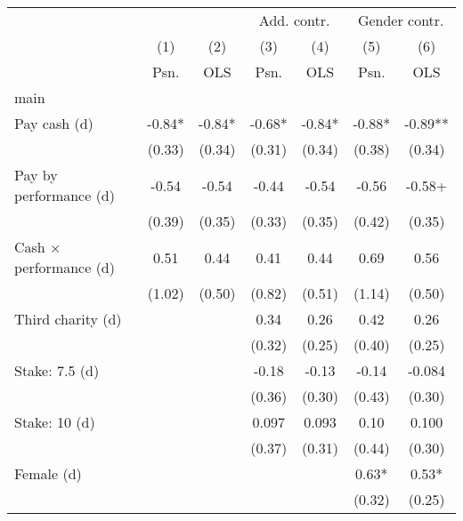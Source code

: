 {
\def\sym#1{\ifmmode^{#1}\else\(^{#1}\)\fi}
\begin{tabular}{l*{6}{c}}
\toprule
                &\multicolumn{2}{c}{ }  &\multicolumn{2}{c}{Add. contr.}&\multicolumn{2}{c}{Gender contr.}\\
                &\multicolumn{1}{c}{(1)}&\multicolumn{1}{c}{(2)}&\multicolumn{1}{c}{(3)}&\multicolumn{1}{c}{(4)}&\multicolumn{1}{c}{(5)}&\multicolumn{1}{c}{(6)}\\
                &\multicolumn{1}{c}{Psn.}&\multicolumn{1}{c}{OLS}&\multicolumn{1}{c}{Psn.}&\multicolumn{1}{c}{OLS}&\multicolumn{1}{c}{Psn.}&\multicolumn{1}{c}{OLS}\\
\midrule
main            &           &           &           &           &           &           \\
Pay cash (d)    &    -0.84* &    -0.84* &    -0.68* &    -0.84* &    -0.88* &    -0.89**\\
                &   (0.33)  &   (0.34)  &   (0.31)  &   (0.34)  &   (0.38)  &   (0.34)  \\
Pay by performance (d)&    -0.54  &    -0.54  &    -0.44  &    -0.54  &    -0.56  &    -0.58+ \\
                &   (0.39)  &   (0.35)  &   (0.33)  &   (0.35)  &   (0.42)  &   (0.35)  \\
Cash $\times$ performance (d)&     0.51  &     0.44  &     0.41  &     0.44  &     0.69  &     0.56  \\
                &   (1.02)  &   (0.50)  &   (0.82)  &   (0.51)  &   (1.14)  &   (0.50)  \\
Third charity (d)&           &           &     0.34  &     0.26  &     0.42  &     0.26  \\
                &           &           &   (0.32)  &   (0.25)  &   (0.40)  &   (0.25)  \\
Stake: 7.5 (d)  &           &           &    -0.18  &    -0.13  &    -0.14  &   -0.084  \\
                &           &           &   (0.36)  &   (0.30)  &   (0.43)  &   (0.30)  \\
Stake: 10 (d)   &           &           &    0.097  &    0.093  &     0.10  &    0.100  \\
                &           &           &   (0.37)  &   (0.31)  &   (0.44)  &   (0.30)  \\
Female (d)      &           &           &           &           &     0.63* &     0.53* \\
                &           &           &           &           &   (0.32)  &   (0.25)  \\

\end{tabular}}
